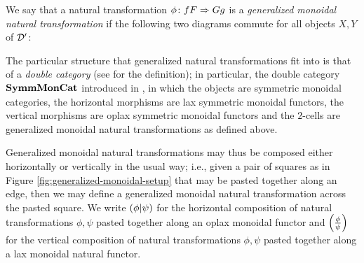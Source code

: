 \documentclass[sigplan,10pt,review]{acmart}\settopmatter{printfolios=true,printccs=false,printacmref=false}
\let\C\undefined
\begin{document}
We say that a natural transformation $\phi\colon fF\Rightarrow Gg$ is a \emph{generalized monoidal natural transformation} if the following two diagrams commute for all objects $X,Y$ of ${\mathcal{D}}'$:
The particular structure that generalized natural transformations fit into is that of a \emph{double category} (see \cite{LimitsInDoubleCategories} for the definition); in particular, the double category ${\normalfont\textbf{SymmMonCat}}$ introduced in \cite{AdjointsInDoubleCategories}, in which the objects are symmetric monoidal categories, the horizontal morphisms are lax symmetric monoidal functors, the vertical morphisms are oplax symmetric monoidal functors and the $2$-cells are generalized monoidal natural transformations as defined above.  

Generalized monoidal natural transformations may thus be composed either horizontally or vertically in the usual way; i.e., given a pair of squares as in Figure \ref{fig:generalized-monoidal-setup} that may be pasted together along an edge, then we may define a generalized monoidal natural transformation across the pasted square.  
We write $\left({\phi}\middle|{\psi}\right)$ for the horizontal composition of natural transformations $\phi,\psi$ pasted together along an oplax monoidal functor and $\left(\frac{\phi}{\psi}\right)$ for the vertical composition of natural transformations $\phi,\psi$ pasted together along a lax monoidal natural functor.
\end{document}
